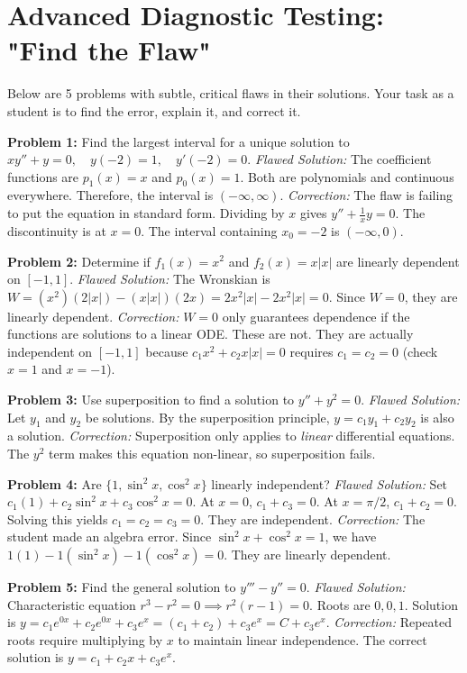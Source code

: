 \documentclass[11pt, a4paper]{article}
\theoremstyle{definition}
\theoremstyle{remark}
\begin{document}
\section{Advanced Diagnostic Testing: "Find the Flaw"}

Below are 5 problems with subtle, critical flaws in their solutions. Your task as a student is to find the error, explain it, and correct it.

\textbf{Problem 1:} Find the largest interval for a unique solution to $x y'' + y = 0, \quad y(-2)=1, \quad y'(-2)=0$.
\textit{Flawed Solution:} The coefficient functions are $p_1(x)=x$ and $p_0(x)=1$. Both are polynomials and continuous everywhere. Therefore, the interval is $(-\infty, \infty)$.
\textit{Correction:} The flaw is failing to put the equation in standard form. Dividing by $x$ gives $y'' + \frac{1}{x}y = 0$. The discontinuity is at $x=0$. The interval containing $x_0 = -2$ is $(-\infty, 0)$.

\textbf{Problem 2:} Determine if $f_1(x) = x^2$ and $f_2(x) = x|x|$ are linearly dependent on $[-1, 1]$.
\textit{Flawed Solution:} The Wronskian is $W = (x^2)(2|x|) - (x|x|)(2x) = 2x^2|x| - 2x^2|x| = 0$. Since $W=0$, they are linearly dependent.
\textit{Correction:} $W=0$ only guarantees dependence if the functions are solutions to a linear ODE. These are not. They are actually independent on $[-1, 1]$ because $c_1 x^2 + c_2 x|x| = 0$ requires $c_1=c_2=0$ (check $x=1$ and $x=-1$).

\textbf{Problem 3:} Use superposition to find a solution to $y'' + y^2 = 0$.
\textit{Flawed Solution:} Let $y_1$ and $y_2$ be solutions. By the superposition principle, $y = c_1 y_1 + c_2 y_2$ is also a solution.
\textit{Correction:} Superposition only applies to \textit{linear} differential equations. The $y^2$ term makes this equation non-linear, so superposition fails.

\textbf{Problem 4:} Are $\{1, \sin^2 x, \cos^2 x\}$ linearly independent?
\textit{Flawed Solution:} Set $c_1(1) + c_2 \sin^2 x + c_3 \cos^2 x = 0$. At $x=0$, $c_1+c_3=0$. At $x=\pi/2$, $c_1+c_2=0$. Solving this yields $c_1=c_2=c_3=0$. They are independent.
\textit{Correction:} The student made an algebra error. Since $\sin^2 x + \cos^2 x = 1$, we have $1(1) - 1(\sin^2 x) - 1(\cos^2 x) = 0$. They are linearly dependent.

\textbf{Problem 5:} Find the general solution to $y''' - y'' = 0$.
\textit{Flawed Solution:} Characteristic equation $r^3 - r^2 = 0 \implies r^2(r-1) = 0$. Roots are $0, 0, 1$. Solution is $y = c_1 e^{0x} + c_2 e^{0x} + c_3 e^x = (c_1+c_2) + c_3 e^x = C + c_3 e^x$.
\textit{Correction:} Repeated roots require multiplying by $x$ to maintain linear independence. The correct solution is $y = c_1 + c_2 x + c_3 e^x$.
\end{document}

